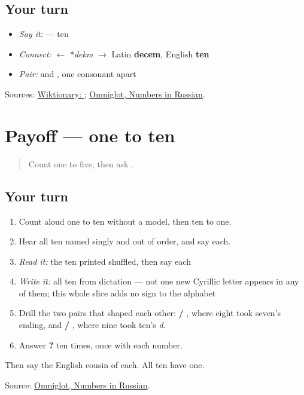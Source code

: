 \subsection*{Your turn}
\begin{itemize}
\raggedright
  \item \emph{Say it:} \textbf{} — ten
  \item \emph{Connect:} \textbf{} $\leftarrow$ *\emph{dekm} $\to$ Latin \textbf{decem}, English \textbf{ten}
  \item \emph{Pair:} \textbf{} and \textbf{}, one consonant apart
\end{itemize}

\begin{tcolorbox}[breakable,colback=teal!4,colframe=teal!35!black,title={Before you move on}]
Sources: \href{https://en.wiktionary.org/wiki/\%D0\%B4\%D0\%B5\%D1\%81\%D1\%8F\%D1\%82\%D1\%8C}{Wiktionary: }; \href{https://www.omniglot.com/language/numbers/russian.htm}{Omniglot, Numbers in Russian}.
\end{tcolorbox}
\section[Practice]{Payoff — one to ten}

\label{lesson:RU-C24-practice}



\begin{quote}
Count one to five, then ask \textbf{}.
\end{quote}

\subsection*{Your turn}
\begin{enumerate}
\raggedright
  \item Count aloud one to ten without a model, then ten to one.
  \item Hear all ten named singly and out of order, and say each.
  \item \emph{Read it:} the ten printed shuffled, then say each
  \item \emph{Write it:} all ten from dictation — not one new Cyrillic letter appears in any of them; this whole slice adds no sign to the alphabet
  \item Drill the two pairs that shaped each other: \textbf{ / }, where eight took seven's ending, and \textbf{ / }, where nine took ten's \emph{d}.
  \item Answer \textbf{?} ten times, once with each number.
\end{enumerate}

Then say the English cousin of each. All ten have one.

\begin{tcolorbox}[breakable,colback=teal!4,colframe=teal!35!black,title={Before you move on}]
Source: \href{https://www.omniglot.com/language/numbers/russian.htm}{Omniglot, Numbers in Russian}.
\end{tcolorbox}
